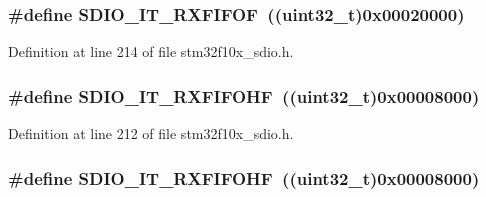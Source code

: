 \subsubsection[{\texorpdfstring{S\+D\+I\+O\+\_\+\+I\+T\+\_\+\+R\+X\+F\+I\+F\+OF}{SDIO_IT_RXFIFOF}}]{\setlength{\rightskip}{0pt plus 5cm}\#define S\+D\+I\+O\+\_\+\+I\+T\+\_\+\+R\+X\+F\+I\+F\+OF~(({\bf uint32\+\_\+t})0x00020000)}\hypertarget{group___s_d_i_o___interrupt__sources_gae60a1d8e5a7caff85d84e513b093b8a8}{}\label{group___s_d_i_o___interrupt__sources_gae60a1d8e5a7caff85d84e513b093b8a8}


Definition at line 214 of file stm32f10x\+\_\+sdio.\+h.

\subsubsection[{\texorpdfstring{S\+D\+I\+O\+\_\+\+I\+T\+\_\+\+R\+X\+F\+I\+F\+O\+HF}{SDIO_IT_RXFIFOHF}}]{\setlength{\rightskip}{0pt plus 5cm}\#define S\+D\+I\+O\+\_\+\+I\+T\+\_\+\+R\+X\+F\+I\+F\+O\+HF~(({\bf uint32\+\_\+t})0x00008000)}\hypertarget{group___s_d_i_o___interrupt__sources_gadcbc1a0de8b9df83b5c6c839b4739c87}{}\label{group___s_d_i_o___interrupt__sources_gadcbc1a0de8b9df83b5c6c839b4739c87}


Definition at line 212 of file stm32f10x\+\_\+sdio.\+h.

\subsubsection[{\texorpdfstring{S\+D\+I\+O\+\_\+\+I\+T\+\_\+\+R\+X\+F\+I\+F\+O\+HF}{SDIO_IT_RXFIFOHF}}]{\setlength{\rightskip}{0pt plus 5cm}\#define S\+D\+I\+O\+\_\+\+I\+T\+\_\+\+R\+X\+F\+I\+F\+O\+HF~(({\bf uint32\+\_\+t})0x00008000)}\hypertarget{group___s_d_i_o___interrupt__sources_gadcbc1a0de8b9df83b5c6c839b4739c87}{}\label{group___s_d_i_o___interrupt__sources_gadcbc1a0de8b9df83b5c6c839b4739c87}


